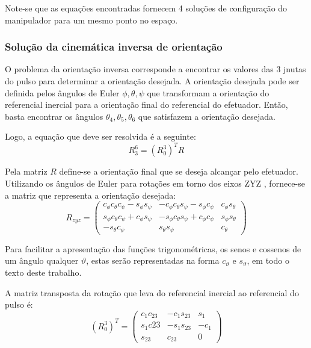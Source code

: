 Note-se que as equações encontradas fornecem 4 soluções de configuração do
manipulador para um mesmo ponto no espaço.

\subsubsection{Solução da cinemática inversa de orientação}

O problema da orientação inversa corresponde a encontrar os valores das 3 jnutas
do pulso para determinar a orientação desejada. A orientação desejada pode ser
definida pelos ângulos de Euler $\phi, \theta, \psi$ que transformam a
orientação do referencial inercial para a orientação final do referencial do
efetuador.
Então, basta encontrar os ângulos $\theta_4, \theta_5, \theta_6$ que satisfazem
a orientação desejada.

Logo, a equação que deve ser resolvida é a seguinte:
%
\begin{equation}
	R_3^6 = (R_0^3)^T R
\end{equation}


Pela matriz $R$ define-se a orientação final que se deseja alcançar pelo
efetuador.
Utilizando os ângulos de Euler para rotações em torno dos eixos ZYZ , fornece-se
a matriz que representa a orientação desejada:
%
\begin{equation} \label{eq::rzyz}
R_{zyz} = 
\begin{pmatrix}
c_\phi c_\theta c_\psi - s_\phi s_\psi & -c_\phi c_\theta s_\psi - s_\phi c_\psi & c_\phi s_\theta\\ 
s_\phi c_\theta c_\psi + c_\phi s_\psi & -s_\phi c_\theta s_\psi + c_\phi c_\psi & s_\phi s_\theta\\ 
-s_\theta c_\psi & s_\theta s_\psi & c_\theta
\end{pmatrix}
\end{equation}
%

Para facilitar a apresentação das funções trigonométricas, os senos e cossenos
de um ângulo qualquer $\vartheta$, estas serão representadas na forma
$c_{\vartheta}$ e $s_{\vartheta}$, em todo o texto deste trabalho.

A matriz transposta da rotação que leva do referencial inercial ao referencial
do pulso é:
%
\begin{equation}
	(R_0^3)^T = 
\begin{pmatrix}
c_1 c_{23} & -c_1 s_{23}  & s_1 \\ 
s_1 c{23} & -s_1 s_{23}  & -c_1 \\ 
s_{23} & c_{23}  & 0 
\end{pmatrix}
\end{equation}

